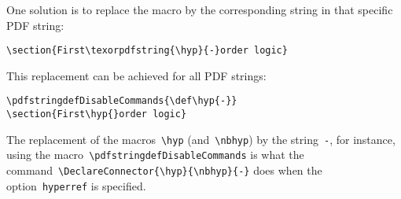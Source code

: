 \documentclass{article}
\begin{document}
One solution is to replace the macro by the corresponding string in
that specific PDF string:
%
\begin{verbatim}
\section{First\texorpdfstring{\hyp}{-}order logic}
\end{verbatim}
%
This replacement can be achieved for all PDF strings:
%
\begin{verbatim}
\pdfstringdefDisableCommands{\def\hyp{-}}
\section{First\hyp{}order logic}
\end{verbatim}
%
The replacement of the macros~\verb|\hyp| (and~\verb|\nbhyp|) by the
string~\texttt{-}, for instance, using the
macro~\verb|\pdfstringdefDisableCommands| is what the
command~\verb|\DeclareConnector{\hyp}{\nbhyp}{-}| does when the
option~\texttt{hyperref} is specified.
\end{document}
